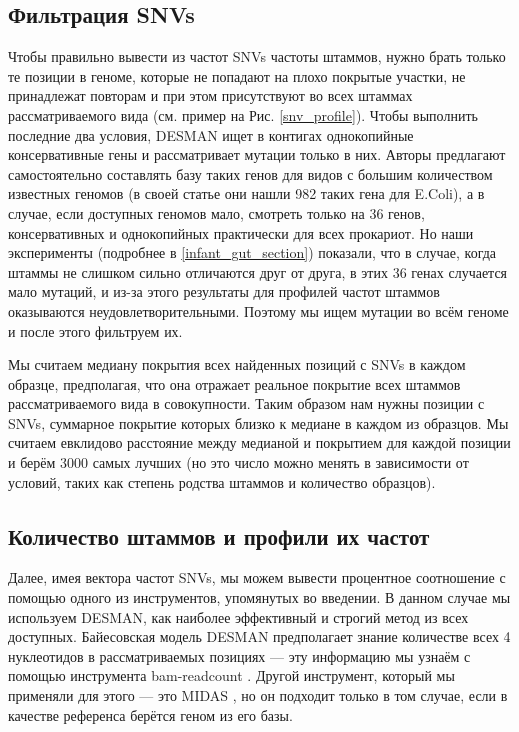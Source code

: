 \documentclass{spbau-diploma}
\begin{document}
\subsection{Фильтрация SNVs}

Чтобы правильно вывести из частот SNVs частоты штаммов, нужно брать только те позиции в геноме, которые не попадают на плохо покрытые участки, не принадлежат повторам и при этом присутствуют во всех штаммах рассматриваемого вида (см. пример на Рис. \ref{snv_profile}). Чтобы выполнить последние два условия, DESMAN ищет в контигах однокопийные консервативные гены и рассматривает мутации только в них. Авторы предлагают самостоятельно составлять базу таких генов для видов с большим количеством известных геномов (в своей статье они нашли 982 таких гена для E.Coli), а в случае, если доступных геномов мало, смотреть только на 36 генов, консервативных и однокопийных практически для всех прокариот. Но наши эксперименты (подробнее в \ref{infant_gut_section}) показали, что в случае, когда штаммы не слишком сильно отличаются друг от друга, в этих 36 генах случается мало мутаций, и из-за этого результаты для профилей частот штаммов оказываются неудовлетворительными. Поэтому мы ищем мутации во всём геноме и после этого фильтруем их. 

Мы считаем медиану покрытия всех найденных позиций с SNVs в каждом образце, предполагая, что она отражает реальное покрытие всех штаммов рассматриваемого вида в совокупности. Таким образом нам нужны позиции с SNVs, суммарное покрытие которых близко к медиане в каждом из образцов. Мы считаем евклидово расстояние между медианой и покрытием для каждой позиции и берём 3000 самых лучших (но это число можно менять в зависимости от условий, таких как степень родства штаммов и количество образцов).

\subsection{Количество штаммов и профили их частот}

Далее, имея вектора частот SNVs, мы можем вывести процентное соотношение с помощью одного из инструментов, упомянутых во введении. В данном случае мы используем DESMAN, как наиболее эффективный и строгий метод из всех доступных. Байесовская модель DESMAN предполагает знание количестве всех 4 нуклеотидов в рассматриваемых позициях --- эту информацию мы узнаём с помощью инструмента bam-readcount \cite{bam_readcount}. Другой инструмент, который мы применяли для этого --- это MIDAS \cite{midas}, но он подходит только в том случае, если в качестве референса берётся геном из его базы.
\end{document}
